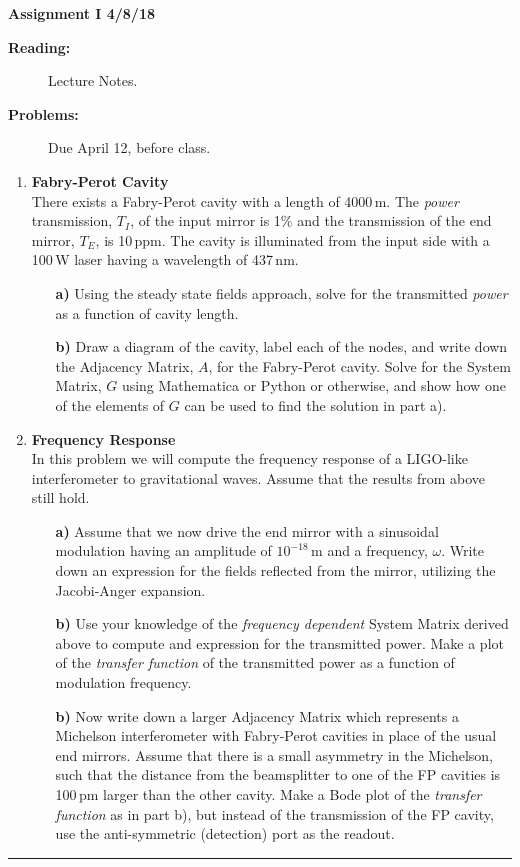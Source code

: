 \documentclass[11pt]{article}
\begin{document}
%
\centerline{\large\bf  \hfill Assignment I \hfill  4/8/18}

\medskip
\begin{description}
\item[{\bf Reading:}] Lecture Notes. \\
\item[{\bf Problems:} \hfill ] Due April 12, before class.
\end{description}


\medskip

\begin{enumerate}

\item
{\bf Fabry-Perot Cavity} \\
There exists a Fabry-Perot cavity with a length of 4000\,m. The \emph{power} transmission, $T_I$, of the input mirror is 1\% and the transmission of the end mirror, $T_E$, is 10\,ppm. The cavity is illuminated from the input side with a 100\,W laser having a wavelength of 437\,nm.
\begin{itemize}
\item[\bf a)] Using the steady state fields approach, solve for the transmitted \emph{power} as a function of cavity length.
\item[\bf b)] Draw a diagram of the cavity, label each of the nodes, and write down the Adjacency Matrix, $A$, for the Fabry-Perot cavity. Solve for the System Matrix, $G$ using Mathematica or Python or otherwise, and show how one of the elements of $G$ can be used to find the solution in part a).
\end{itemize}

\item
{\bf Frequency Response} \\
In this problem we will compute the frequency response of a LIGO-like interferometer to gravitational waves. Assume that the results from above still hold.
\begin{itemize}
\item[\bf a)] Assume that we now drive the end mirror with a sinusoidal modulation having an amplitude of $10^{-18}$\,m and a frequency, $\omega$. Write down an expression for the fields reflected from the mirror, utilizing the Jacobi-Anger expansion.
\item[\bf b)] Use your knowledge of the \emph{frequency dependent} System Matrix derived above to compute and expression for the transmitted power. Make a plot of the \emph{transfer function} of the transmitted power as a function of modulation frequency.
\item[\bf b)] Now write down a larger Adjacency Matrix which represents a Michelson interferometer with Fabry-Perot cavities in place of the usual end mirrors. Assume that there is a small asymmetry in the Michelson, such that the distance from the beamsplitter to one of the FP cavities is 100\,pm larger than the other cavity.
Make a Bode plot of the \emph{transfer function} as in part b), but instead of the transmission of the FP cavity, use the anti-symmetric (detection) port as the readout.
\end{itemize}

\end{enumerate}

\bigskip
{\color{Sepia} \hrule}
\end{document}
